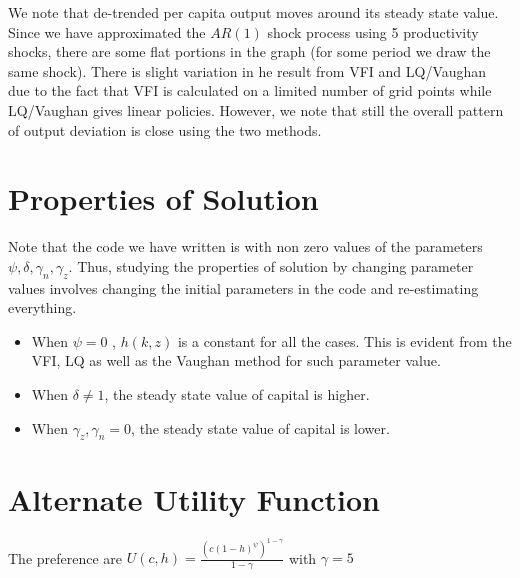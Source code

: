 \documentclass[12pt]{article}
\begin{document}
We note that de-trended per capita output moves around its steady state value. Since we have approximated the $AR(1)$ shock process using 5 productivity shocks, there are some flat portions in the graph (for some period we draw the same shock). There is slight variation in he result from VFI and LQ/Vaughan due to the fact that VFI is calculated on a limited number of grid points while LQ/Vaughan gives linear policies. However, we note that still the overall pattern of output deviation is close using the two methods.

\section{Properties of Solution }
Note that the code we have written is with non zero values of the parameters $\psi, \delta, \gamma_n, \gamma_z$. Thus, studying the properties of solution by changing parameter values involves changing the initial parameters in the code and re-estimating everything. 
\begin{itemize}
\item When $\psi = 0$ , $h(k, z)$ is a constant for all the cases. This is evident from the VFI, LQ as well as the Vaughan method for such parameter value.
\item When $\delta \neq 1$, the steady state value of capital is higher.
\item When $\gamma_z, \gamma_n =0$, the steady state value of capital is lower.
\end{itemize}




\section{Alternate Utility Function}

The preference are $U(c, h) = \frac{(c(1-h)^{\psi})^{1-\gamma}}{1-\gamma}$  with $\gamma = 5$
\end{document}
